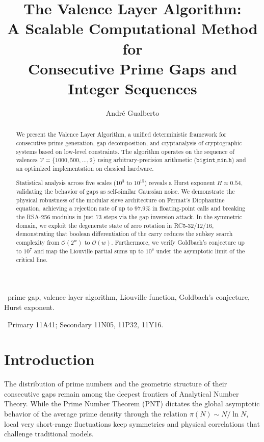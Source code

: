 \documentclass[12pt,a4paper]{article}
\title{The Valence Layer Algorithm:\\A Scalable Computational Method for\\Consecutive Prime Gaps and Integer Sequences}
\author{Andr\'e Gualberto}
\theoremstyle{plain}
\begin{document}
\maketitle

\begin{abstract}
We present the Valence Layer Algorithm, a unified deterministic framework for consecutive prime generation, gap decomposition, and cryptanalysis of cryptographic systems based on low-level constraints. The algorithm operates on the sequence of valences $\mathcal{V} = \{1000, 500, \dots, 2\}$ using arbitrary-precision arithmetic ($\mathtt{bigint\_min.h}$) and an optimized implementation on classical hardware.

Statistical analysis across five scales ($10^3$ to $10^{15}$) reveals a Hurst exponent $H \approx 0.54$, validating the behavior of gaps as self-similar Gaussian noise. We demonstrate the physical robustness of the modular sieve architecture on Fermat's Diophantine equation, achieving a rejection rate of up to $97.9\%$ in floating-point calls and breaking the RSA-256 modulus in just 73 steps via the gap inversion attack. In the symmetric domain, we exploit the degenerate state of zero rotation in RC5-32/12/16, demonstrating that boolean differentiation of the carry reduces the subkey search complexity from $\mathcal{O}(2^w)$ to $\mathcal{O}(w)$. Furthermore, we verify Goldbach's conjecture up to $10^7$ and map the Liouville partial sums up to $10^8$ under the asymptotic limit of the critical line.
\end{abstract}

\ prime gap, valence layer algorithm, Liouville function, Goldbach's conjecture, Hurst exponent.

\ Primary 11A41;
Secondary 11N05, 11P32, 11Y16.

\section{Introduction}
\label{sec:intro}

The distribution of prime numbers and the geometric structure of their consecutive gaps remain among the deepest frontiers of Analytical Number Theory. While the Prime Number Theorem (PNT) dictates the global asymptotic behavior of the average prime density through the relation $\pi(N) \sim N / \ln N$, local very short-range fluctuations keep symmetries and physical correlations that challenge traditional models.
\end{document}
